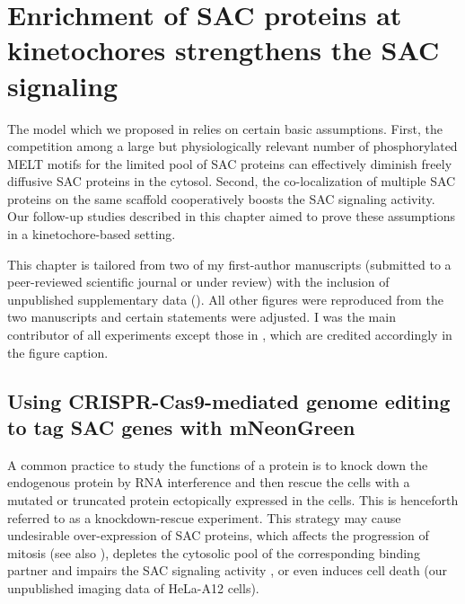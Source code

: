 \chapter{Enrichment of SAC proteins at kinetochores strengthens the SAC signaling}
\label{chpt:3}

The model which we proposed in  relies on certain basic assumptions. First, the competition among a large but physiologically relevant number of phosphorylated MELT motifs for the limited pool of SAC proteins can effectively diminish freely diffusive SAC proteins in the cytosol. Second, the co-localization of multiple SAC proteins on the same  scaffold cooperatively boosts the SAC signaling activity. Our follow-up studies described in this chapter aimed to prove these assumptions in a kinetochore-based setting.

This chapter is tailored from two of my first-author manuscripts (submitted to a peer-reviewed scientific journal or under review) with the inclusion of unpublished supplementary data (). All other figures were reproduced from the two manuscripts and certain statements were adjusted. I was the main contributor of all experiments except those in , which are credited accordingly in the figure caption.

\section{Using CRISPR-Cas9-mediated genome editing to tag SAC genes with mNeonGreen }

A common practice to study the functions of a protein is to knock down the endogenous protein by RNA interference and then rescue the cells with a mutated or truncated protein ectopically expressed in the cells. This is henceforth referred to as a knockdown-rescue experiment.
This strategy may cause undesirable over-expression of SAC proteins, which affects the progression of mitosis \cite{Bub1Overexpression-AuroraBHyperactivation} (see also ), depletes the cytosolic pool of the corresponding binding partner and impairs the SAC signaling activity \cite{Bub3Competition, FissionYeastSACRobustness, ATMPhosphorylatesMad1S214, MAD1Overexpression_Ryan2012}, or even induces cell death (our unpublished imaging data of HeLa-A12 cells).

